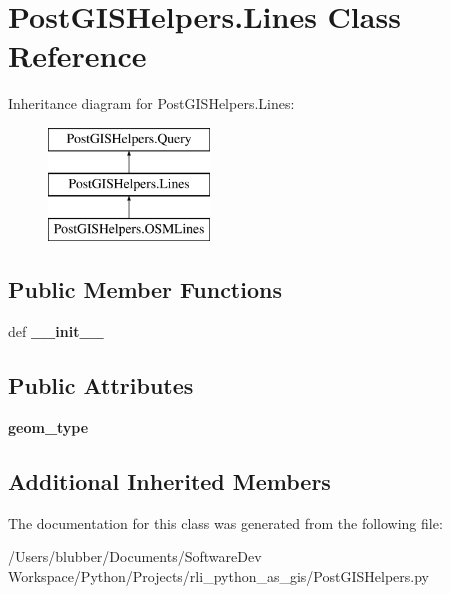 \hypertarget{class_post_g_i_s_helpers_1_1_lines}{}\section{Post\+G\+I\+S\+Helpers.\+Lines Class Reference}
\label{class_post_g_i_s_helpers_1_1_lines}
Inheritance diagram for Post\+G\+I\+S\+Helpers.\+Lines\+:\begin{figure}[H]
\begin{center}
\leavevmode
\includegraphics[height=3.000000cm]{class_post_g_i_s_helpers_1_1_lines}
\end{center}
\end{figure}
\subsection*{Public Member Functions}
\begin{DoxyCompactItemize}
\item 
\hypertarget{class_post_g_i_s_helpers_1_1_lines_a994a60bd3368b23dc814b6c5e51bab16}{}def {\bfseries \+\_\+\+\_\+init\+\_\+\+\_\+}\label{class_post_g_i_s_helpers_1_1_lines_a994a60bd3368b23dc814b6c5e51bab16}

\end{DoxyCompactItemize}
\subsection*{Public Attributes}
\begin{DoxyCompactItemize}
\item 
\hypertarget{class_post_g_i_s_helpers_1_1_lines_ad29e175daa61407737beea9117cc23b7}{}{\bfseries geom\+\_\+type}\label{class_post_g_i_s_helpers_1_1_lines_ad29e175daa61407737beea9117cc23b7}

\end{DoxyCompactItemize}
\subsection*{Additional Inherited Members}


The documentation for this class was generated from the following file\+:\begin{DoxyCompactItemize}
\item 
/\+Users/blubber/\+Documents/\+Software\+Dev Workspace/\+Python/\+Projects/rli\+\_\+python\+\_\+as\+\_\+gis/Post\+G\+I\+S\+Helpers.\+py\end{DoxyCompactItemize}
